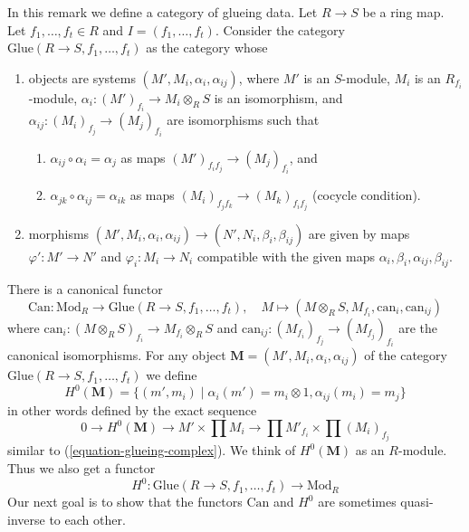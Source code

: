 \begin{remark}
\label{remark-glueing-data}
In this remark we define a category of glueing data.
Let $R \to S$ be a ring map.
Let $f_1, \ldots, f_t \in R$ and $I = (f_1, \ldots, f_t)$.
Consider the category $\text{Glue}(R \to S, f_1, \ldots, f_t)$
as the category whose
\begin{enumerate}
\item objects are systems $(M', M_i, \alpha_i, \alpha_{ij})$, where
$M'$ is an $S$-module, $M_i$ is an $R_{f_i}$-module,
$\alpha_i : (M')_{f_i} \to M_i \otimes_R S$ is an isomorphism, and
$\alpha_{ij} : (M_i)_{f_j} \to (M_j)_{f_i}$ are isomorphisms
such that
\begin{enumerate}
\item $\alpha_{ij} \circ \alpha_i = \alpha_j$ as maps
$(M')_{f_if_j} \to (M_j)_{f_i}$, and
\item $\alpha_{jk} \circ \alpha_{ij} = \alpha_{ik}$ as maps
$(M_i)_{f_jf_k} \to (M_k)_{f_if_j}$ (cocycle condition).
\end{enumerate}
\item morphisms
$(M', M_i, \alpha_i, \alpha_{ij}) \to (N', N_i, \beta_i, \beta_{ij})$
are given by maps $\varphi' : M' \to N'$ and $\varphi_i : M_i \to N_i$
compatible with the given maps $\alpha_i, \beta_i, \alpha_{ij}, \beta_{ij}$.
\end{enumerate}
There is a canonical functor
$$
\text{Can} : \text{Mod}_R
\longrightarrow
\text{Glue}(R \to S, f_1, \ldots, f_t),
\quad
M \longmapsto (M \otimes_R S, M_{f_i}, \text{can}_i, \text{can}_{ij})
$$
where $\text{can}_i : (M \otimes_R S)_{f_i} \to M_{f_i} \otimes_R S$
and $\text{can}_{ij} : (M_{f_i})_{f_j} \to (M_{f_j})_{f_i}$
are the canonical isomorphisms. For any object
$\mathbf{M} = (M', M_i, \alpha_i, \alpha_{ij})$ of the category
$\text{Glue}(R \to S, f_1, \ldots, f_t)$ we define
$$
H^0(\mathbf{M}) =
\{(m', m_i) \mid \alpha_i(m') = m_i \otimes 1, \alpha_{ij}(m_i) = m_j\}
$$
in other words defined by the exact sequence
$$
0 \to H^0(\mathbf{M}) \to
M' \times \prod M_i \to
\prod M'_{f_i}
\times
\prod (M_i)_{f_j}
$$
similar to (\ref{equation-glueing-complex}).
We think of $H^0(\mathbf{M})$ as an $R$-module. Thus we also get a functor
$$
H^0 :
\text{Glue}(R \to S, f_1, \ldots, f_t)
\longrightarrow
\text{Mod}_R
$$
Our next goal is to show that the functors
$\text{Can}$ and $H^0$ are sometimes quasi-inverse to each other.
\end{remark}

